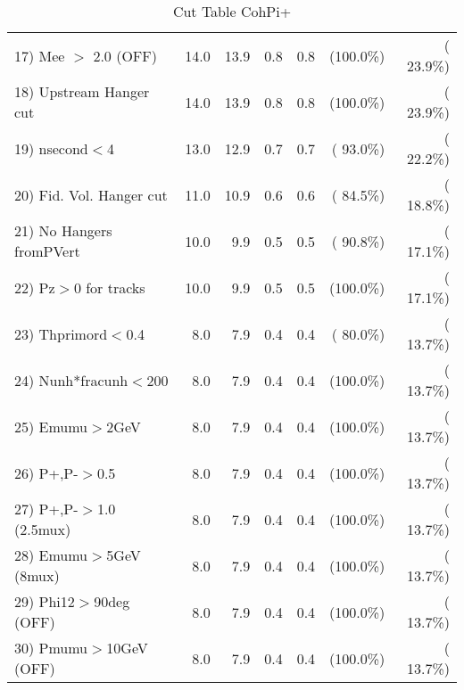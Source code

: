 \begin{table}[h!]
\begin{tabular}{||l||r|r|r|r|r|r||}
 17) Mee $>$ 2.0  (OFF)   &         14.0 &         13.9 &          0.8 &          0.8 & (100.0\%) & ( 23.9\%) \\
 18) Upstream Hanger cut  &         14.0 &         13.9 &          0.8 &          0.8 & (100.0\%) & ( 23.9\%) \\
 19) nsecond$<$4          &         13.0 &         12.9 &          0.7 &          0.7 & ( 93.0\%) & ( 22.2\%) \\
 20) Fid. Vol. Hanger cut &         11.0 &         10.9 &          0.6 &          0.6 & ( 84.5\%) & ( 18.8\%) \\
 21) No Hangers fromPVert &         10.0 &          9.9 &          0.5 &          0.5 & ( 90.8\%) & ( 17.1\%) \\
 22) Pz$>$0 for tracks    &         10.0 &          9.9 &          0.5 &          0.5 & (100.0\%) & ( 17.1\%) \\
 23) Thprimord$<$0.4      &          8.0 &          7.9 &          0.4 &          0.4 & ( 80.0\%) & ( 13.7\%) \\
 24) Nunh*fracunh$<$200   &          8.0 &          7.9 &          0.4 &          0.4 & (100.0\%) & ( 13.7\%) \\
 25) Emumu$>$2GeV         &          8.0 &          7.9 &          0.4 &          0.4 & (100.0\%) & ( 13.7\%) \\
 26) P+,P-$>$0.5          &          8.0 &          7.9 &          0.4 &          0.4 & (100.0\%) & ( 13.7\%) \\
 27) P+,P-$>$1.0 (2.5mux) &          8.0 &          7.9 &          0.4 &          0.4 & (100.0\%) & ( 13.7\%) \\
 28) Emumu$>$5GeV  (8mux) &          8.0 &          7.9 &          0.4 &          0.4 & (100.0\%) & ( 13.7\%) \\
 29) Phi12$>$90deg  (OFF) &          8.0 &          7.9 &          0.4 &          0.4 & (100.0\%) & ( 13.7\%) \\
 30) Pmumu$>$10GeV  (OFF) &          8.0 &          7.9 &          0.4 &          0.4 & (100.0\%) & ( 13.7\%) \\
 \hline
 \hline
 \end{tabular}
 \caption{Cut Table  CohPi+   }
 \label{tab-cutcohjpsi-mumu_nuecc}
 \end{table}

